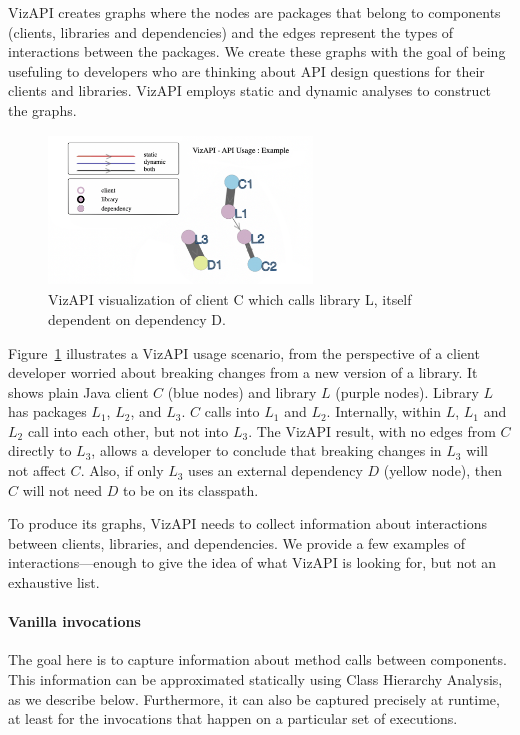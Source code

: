
VizAPI creates graphs where the nodes are packages that belong to components (clients, libraries and dependencies) and the edges represent the types of interactions between the packages. We create these graphs with the goal of being usefuling to developers who are thinking about API design questions for their clients and libraries. VizAPI employs static and dynamic analyses to construct the graphs. 

\begin{figure}[h]
\begin{center}
\includegraphics[height=4cm,width=7cm]{images/intro-example.png}
\caption{VizAPI visualization of client C which calls library L, itself dependent on dependency D.}
\label{fig:example}
\end{center}
\end{figure}

Figure~\ref{fig:example} illustrates a VizAPI usage scenario, from the perspective of a client developer worried about breaking changes from a new version of a library. It shows plain Java client $C$ (blue nodes) and library $L$ (purple nodes). Library $L$ has packages $L_1$, $L_2$, and $L_3$. $C$ calls into $L_1$ and $L_2$. Internally, within $L$, $L_1$ and $L_2$ call into each other, but not into $L_3$. The VizAPI result, with no edges from $C$ directly to $L_3$, allows a developer to conclude that breaking changes in $L_3$ will not affect $C$. Also, if only $L_3$ uses an external dependency $D$ (yellow node), then $C$ will not need $D$ to be on its classpath.

To produce its graphs, VizAPI needs to collect information about interactions between clients, libraries, and dependencies. We provide a few examples of interactions---enough to give the idea of what VizAPI is looking for, but not an exhaustive list.

\paragraph{Vanilla invocations} The goal here is to capture information about method calls between components. This information can be approximated statically using Class Hierarchy Analysis, as we describe below. Furthermore, it can also be captured precisely at runtime, at least for the invocations that happen on a particular set of executions.

